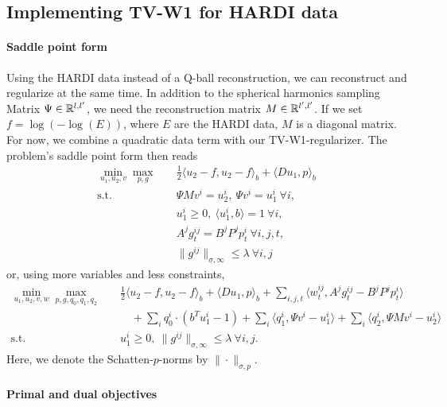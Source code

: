 
\subsection{Implementing TV-W1 for HARDI data}

\paragraph{Saddle point form}

Using the HARDI data instead of a Q-ball reconstruction, we can reconstruct
and regularize at the same time.
In addition to the spherical harmonics sampling Matrix $\Psi \in \mathbb{R}^{l,l'}$,
we need the reconstruction matrix $M \in \mathbb{R}^{l',l'}$.
If we set $f = \log(-\log(E))$, where $E$ are the HARDI data, $M$ is a diagonal
matrix.
For now, we combine a quadratic data term with our TV-W1-regularizer.
The problem's saddle point form then reads
\begin{align*}
    \min_{u_1,u_2,v} \max_{p,g} \quad
        & \frac{1}{2} \langle u_2 - f, u_2 - f \rangle_b + \langle Du_1, p \rangle_b \\
    \text{s.t.}\quad 
        & \Psi M v^i = u_2^i, ~\Psi v^i = u_1^i ~\forall i, \\
        & u_1^i \geq 0, ~\langle u_1^i, b \rangle = 1 ~\forall i, \\
        & A^j g^{ij}_t = B^j P^j p^i_t ~\forall i,j,t, \\
        & \|g^{ij}\|_{\sigma,\infty} \leq \lambda ~\forall i,j
\end{align*}
or, using more variables and less constraints,
\begin{align*}
    \min_{u_1,u_2,v,w} \max_{p,g,q_0,q_1,q_2} \quad
        & \frac{1}{2} \langle u_2 - f, u_2 - f \rangle_b
            + \langle Du_1, p \rangle_b
            + \sum_{i,j,t} \langle w^{ij}_t, A^j g^{ij}_t - B^j P^j p^i_t \rangle \\
        &\quad + \sum_{i} q_0^i \cdot (b^T u_1^i - 1)
            + \sum_{i} \langle q_1^i, \Psi v^i - u_1^i \rangle
            + \sum_{i} \langle q_2^i, \Psi M v^i - u_2^i \rangle \\
    \text{s.t.}\quad 
        & u_1^i \geq 0, ~\|g^{ij}\|_{\sigma,\infty} \leq \lambda ~\forall i,j.
\end{align*}
Here, we denote the Schatten-$p$-norms by $\|\cdot\|_{\sigma,p}$.

\paragraph{Primal and dual objectives}

